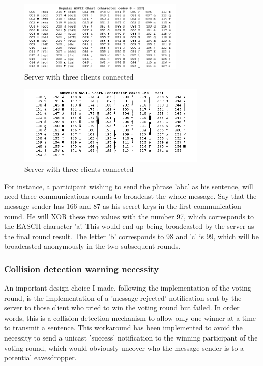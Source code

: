 \begin{figure}[H]
    \centering
    \includegraphics[width=0.7\textwidth]{Images/Design/ascii.png}
    \caption{Server with three clients connected}
    \label{fig:ascii}
\end{figure}

\begin{figure}[H]
    \centering
    \includegraphics[width=0.8\textwidth]{Images/Design/eascii.png}
    \caption{Server with three clients connected}
    \label{fig:eascii}
\end{figure}


For instance, a participant wishing to send the phrase 'abc' as his sentence, will need three communications rounds to broadcast the whole message. Say that the message sender has 166 and 87 as his secret keys in the first communication round. He will XOR these two values with the number 97, which corresponds to the EASCII character 'a'. This would end up being broadcasted by the server as the final round result. The letter 'b' corresponds to 98 and 'c' is 99, which will be broadcasted anonymously in the two subsequent rounds.


\subsubsection{Collision detection warning necessity} \label{sec:collisionDetectionWarnings}
An important design choice I made, following the implementation of the voting round, is the implementation of a 'message rejected' notification sent by the server to those client who tried to win the voting round but failed. In order words, this is a collision detection mechanism to allow only one winner at a time to transmit a sentence. This workaround has been implemented to avoid the necessity to send a unicast 'success' notification to the winning participant of the voting round, which would obviously uncover who the message sender is to a potential eavesdropper.

